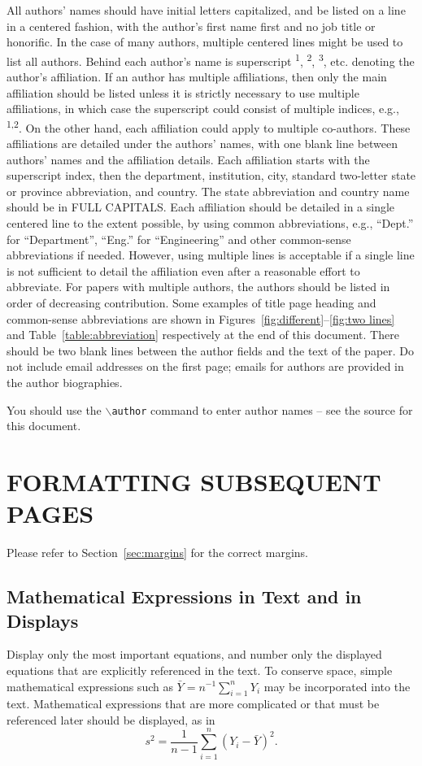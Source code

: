 \documentclass{wscpaperproc}
\theoremstyle{wsc}
\begin{document}
All authors' names should have initial letters capitalized, and be listed on a line in a centered fashion, with the author's first name first and no job title or honorific. In the case of many authors, multiple centered lines might be used to list all authors. Behind each author's name is superscript \textsuperscript{1}, \textsuperscript{2}, \textsuperscript{3}, etc. denoting the author's affiliation. If an author has multiple affiliations, then only the main affiliation should be listed unless it is strictly necessary to use multiple affiliations, in which case the superscript could consist of multiple indices, e.g., \textsuperscript{1,2}. On the other hand, each affiliation could apply to multiple co-authors.
These affiliations are detailed under the authors' names, with one blank line between authors' names and the affiliation details. Each affiliation starts with the superscript index, then the department, institution, city, standard two-letter state or province abbreviation, and country. The state abbreviation and country name should be in FULL CAPITALS.
Each affiliation should be detailed in a single centered line to the extent possible, by using common abbreviations, e.g., ``Dept.'' for ``Department'', ``Eng.'' for ``Engineering'' and other common-sense abbreviations if needed. However, using multiple lines is acceptable if a single line is not sufficient to detail the affiliation even after a reasonable effort to abbreviate.
For papers with multiple authors, the authors should be listed in order of decreasing contribution. Some examples of title page heading and common-sense abbreviations are shown in Figures~\ref{fig:different}--\ref{fig:two lines} and Table~\ref{table:abbreviation} respectively at the end of this document. There should be two blank lines between the author fields and the text of the paper. Do not include email addresses on the first page; emails for authors are provided in the author biographies.


You should use the {\tt $\backslash$author} command to enter author names -- see the source for this document.

\section{FORMATTING SUBSEQUENT PAGES}
Please refer to Section~\ref{sec:margins} for the correct margins.

\subsection{Mathematical Expressions in Text and in Displays}
Display only the most important equations, and number only the displayed equations that are explicitly referenced in the text.
To conserve space, simple mathematical expressions such as $\bar Y = n^{-1} \sum_{i=1}^n Y_i$ may be incorporated into the text.
Mathematical expressions that are more complicated or that must be referenced later should be displayed, as in
$$s^2 = \frac 1 {n-1} \sum_{i=1}^n (Y_i - \bar Y)^2.$$
\end{document}
